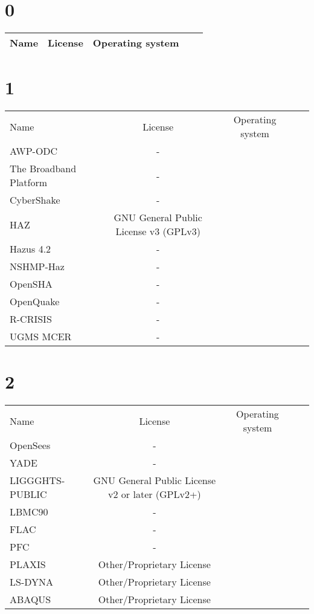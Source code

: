
\section{0}

\begin{table}[]
    \centering
    \begin{tabular}{l|cccc}
    \toprule
    Name &  License & Operating system\\

    \bottomrule
    \end{tabular}
    \end{table}

\section{1}

\begin{table}[]
    \centering
    \begin{tabular}{l|cccc}
    \toprule
    Name &  License & Operating system\\
        AWP-ODC & - &\\
        The Broadband Platform & - &\\
        CyberShake & - &\\
        HAZ &  GNU General Public License v3 (GPLv3) &\\
        Hazus 4.2 & - &\\
        NSHMP-Haz & - &\\
        OpenSHA & - &\\
        OpenQuake & - &\\
        R-CRISIS & - &\\
        UGMS MCER & - &\\

    \bottomrule
    \end{tabular}
    \end{table}

\section{2}

\begin{table}[]
    \centering
    \begin{tabular}{l|cccc}
    \toprule
    Name &  License & Operating system\\
        OpenSees & - &\\
        YADE & - &\\
        LIGGGHTS-PUBLIC &  GNU General Public License v2 or later (GPLv2+) &\\
        LBMC90 & - &\\
        FLAC & - &\\
        PFC & - &\\
        PLAXIS &  Other/Proprietary License &\\
        LS-DYNA &  Other/Proprietary License &\\
        ABAQUS &  Other/Proprietary License &\\

    \bottomrule
    \end{tabular}
\end{table}


